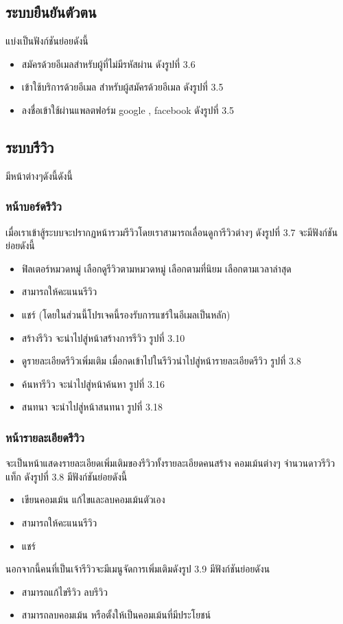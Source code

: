 \subsection{ระบบยืนยันตัวตน}
แบ่งเป็นฟังก์ชันย่อยดังนี้

\begin{itemize}
  \item สมัครด้วยอีเมลสำหรับผู้ที่ไม่มีรหัสผ่าน ดังรูปที่ 3.6
  \item เข้าใช้บริการด้วยอีเมล สำหรับผู้สมัครด้วยอีเมล ดังรูปที่ 3.5
  \item ลงชื่อเข้าใช้ผ่านแพลตฟอร์ม google , facebook ดังรูปที่ 3.5 
 \end{itemize}

\subsection{ระบบรีวิว}
มีหน้าต่างๆดังนี้ดังนี้

\subsubsection{หน้าบอร์ดรีวิว}
เมื่อเราเข้าสู้ระบบจะปรากฏหน้ารวมรีวิวโดยเราสามารถเลื่อนดูการีวิวต่างๆ ดังรูปที่ 3.7  จะมีฟังก์ชันย่อยดังนี้
\begin{itemize}
  \item ฟิลเตอร์หมวดหมู่ เลือกดูรีวิวตามหมวดหมู่ เลือกตามที่นิยม เลือกตามเวลาล่าสุด 
  \item สามารถให้คะแนนรีวิว 
  \item แชร์ (โดยในส่วนนี้โปรเจคนี้รองรับการแชร์ในอีเมลเป็นหลัก)
  \item สร้างรีวิว จะนำไปสู่หน้าสร้างการรีวิว รูปที่ 3.10
  \item ดูรายละเอียดรีวิวเพิ่มเติม เมื่อกดเข้าไปในรีวิวนำไปสู่หน้ารายละเอียดรีวิว รูปที่ 3.8
  \item ค้นหารีวิว จะนำไปสู่หน้าค้นหา รูปที่ 3.16
  \item สนทนา จะนำไปสู่หน้าสนทนา รูปที่ 3.18
 \end{itemize}


 \subsubsection{หน้ารายละเอียดรีวิว}
 จะเป็นหน้าแสดงรายละเอียดเพิ่มเติมของรีวิวทั้งรายละเอียดคนสร้าง คอมเม้นต่างๆ จำนวนดาวรีวิว แท็ก ดังรูปที่ 3.8  มีฟังก์ชันย่อยดังนี้
 \begin{itemize}
  \item เขียนคอมเม้น แก้ไขและลบคอมเม้นตัวเอง
  \item สามารถให้คะแนนรีวิว 
  \item แชร์ 
\end{itemize}
นอกจากนี้คนที่เป็นเจ้ารีวิวจะมีเมนูจัดการเพิ่มเติมดังรูป 3.9 มีฟังก์ชันย่อยดังน
\begin{itemize}
  \item สามารถแก้ไขรีวิว ลบรีวิว
  \item สามารถลบคอมเม้น หรือตั้งให้เป็นคอมเม้นที่มีประโยชน์
\end{itemize}


